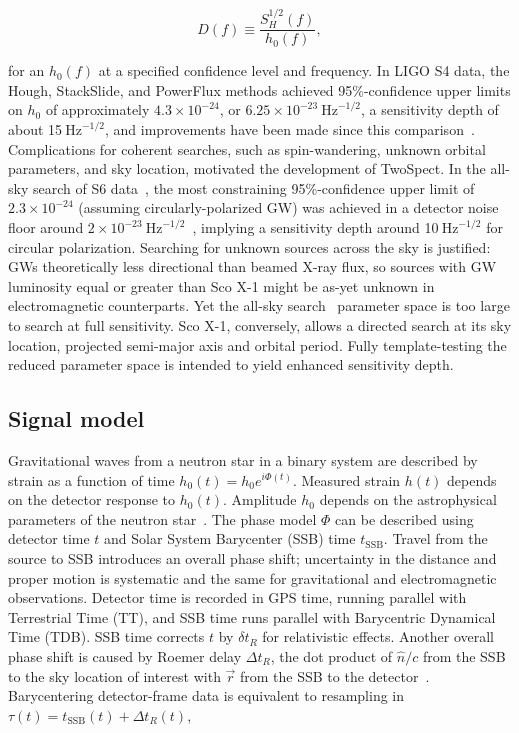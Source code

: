 \documentclass[12pt]{iopart}
\begin{document}
\begin{equation}
D(f) \equiv \frac{S_H^{1/2}(f)}{h_0(f)},
\end{equation}

\noindent for an $h_0(f)$ at a specified confidence level and frequency.
In LIGO S4 data, the Hough, StackSlide, and PowerFlux methods achieved 95\%-confidence upper limits on $h_0$ of approximately $4.3\times 10^{-24}$,
or $6.25\times 10^{-23} \mathrm{~Hz}^{-1/2}$,
a sensitivity depth of about 15$\mathrm{~Hz}^{-1/2}$,
and improvements have been made since this comparison~\cite{LSCPulsarS4}.
Complications for coherent searches, such as spin-wandering, unknown orbital parameters, and sky location, motivated the development of TwoSpect.
In the all-sky search of S6 data~\cite{GoetzTwoSpectResults2014}, the most constraining 95\%-confidence upper limit of $2.3\times10^{-24}$ (assuming circularly-polarized GW) was achieved in a detector noise floor around $2\times 10^{-23} \mathrm{~Hz}^{-1/2}$~\cite{Fricke2009}, implying a sensitivity depth around 10$\mathrm{~Hz}^{-1/2}$ for circular polarization.
Searching for unknown sources across the sky is justified: GWs theoretically less directional than beamed X-ray flux, so sources with GW luminosity equal or greater than Sco X-1 might be as-yet unknown in electromagnetic counterparts.
Yet the all-sky search~\cite{GoetzTwoSpectMethods2011} parameter space is too large to search at full sensitivity.
Sco X-1, conversely, allows a directed search at its sky location, projected semi-major axis and orbital period.
Fully template-testing the reduced parameter space is intended to yield enhanced sensitivity depth.


    \subsection{Signal model}
    \label{signal-model-appendix}


Gravitational waves from a neutron star in a binary system are described by strain as a function of time $h_0(t) = h_0 e^{i \Phi(t)}$. 
Measured strain $h(t)$ depends on the detector response to $h_0(t)$.
Amplitude $h_0$ depends on the astrophysical parameters of the neutron star~\cite{Jaranowski1998}.
The phase model $\Phi$ can be described using detector time $t$ and Solar System Barycenter (SSB) time $t_\mathrm{SSB}$.
Travel from the source to SSB introduces an overall phase shift; uncertainty in the distance and proper motion is systematic and the same for gravitational and electromagnetic observations.
Detector time is recorded in GPS time, running parallel with Terrestrial Time (TT), and SSB time runs parallel with Barycentric Dynamical Time (TDB). 
SSB time corrects $t$ by $\delta t_R$ for relativistic effects.
Another overall phase shift is caused by  Roemer delay $\Delta t_R$, the dot product of $\hat{n}/c$ from the SSB to the sky location of interest with $\vec{r}$ from the SSB to the detector~\cite{Jaranowski1998,GoetzTwoSpectMethods2011,TwoSpectCoherentGoetz2015}.
Barycentering detector-frame data is equivalent to resampling in $\tau(t) = t_\mathrm{SSB}(t) + \Delta t_R(t)$, 
\end{document}
